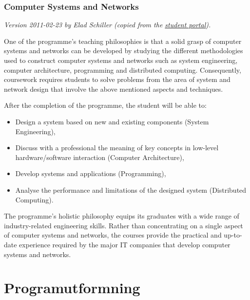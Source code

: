 \documentclass[twocolumn]{article}
\newcommand{\meta}[1]{{\small \emph{#1}}}
\begin{document}
\subsubsection{Computer Systems and Networks}%
\meta{Version 2011-02-23 by Elad Schiller (copied from the
  \href{https://www.student.chalmers.se/sp/program?program_id=814}{student
    portal}).}

One of the programme's teaching philosophies is that a solid grasp of
computer systems and networks can be developed by studying the
different methodologies used to construct computer systems and
networks such as system engineering, computer architecture,
programming and distributed computing. Consequently, course\-work
requires students to solve problems from the area of system and
network design that involve the above mentioned aspects and techniques.

After the completion of the programme, the student will be able to:
\begin{itemize}
\item Design a system based on new and existing components (System
  Engineering),
\item Discuss with a professional the meaning of key concepts in
  low-level hardware/software interaction (Computer Architecture),
\item Develop systems and applications (Programming),
\item Analyse the performance and limitations of the designed system
  (Distributed Computing).
\end{itemize}

The programme's holistic philosophy equips its graduates with a wide
range of industry-related engineering skills. Rather than
concentrating on a single aspect of computer systems and networks, the
courses provide the practical and up-to-date experience required by
the major IT companies that develop computer systems and networks.

\section{Programutformning}
\newcommand{\courselink}[2]{\href{https://www.student.chalmers.se/sp/course?course_id=#1}{#2}}

\newcommand{\introFP }{\courselink{16717}{Introduktion till funktionell programmering}}
\newcommand{\DiskMat }{\courselink{16714}{Inledande diskret matematik}}
\newcommand{\DigoDat }{\courselink{16012}{Digital- och  datorteknik}}
\newcommand{\LinAlg  }{\courselink{16376}{Linjär algebra}}
\newcommand{\MOP     }{\courselink{15446}{Maskinorienterad programmering}}
\newcommand{\MatAn   }{\courselink{15413}{Matematisk analys}}
\newcommand{\ElKrets }{\courselink{15353}{Elektriska kretsar och fält}}
\newcommand{\Barkraft}{\courselink{16340}{Bärkraftig resursanvändning}}
\end{document}
